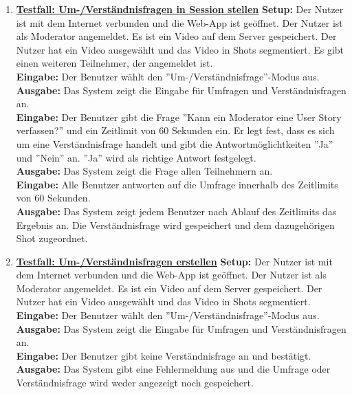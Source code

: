 \begin{enumerate}
	
	\item \underline{\textbf{Testfall: Um-/Verständnisfragen in Session stellen}} \linebreak
	\textbf{Setup:} Der Nutzer ist mit dem Internet verbunden und die Web-App ist geöffnet. Der Nutzer ist als Moderator angemeldet. Es ist ein Video auf dem Server gespeichert. Der Nutzer hat ein Video ausgewählt und das Video in Shots segmentiert. Es gibt einen weiteren Teilnehmer, der angemeldet ist.  \\
	\textbf{Eingabe:} Der Benutzer wählt den ''Um-/Verständnisfrage''-Modus aus. \\
	\textbf{Ausgabe:} Das System zeigt die Eingabe für Umfragen und Verständnisfragen an.\\ 
	\textbf{Eingabe:} Der Benutzer gibt die Frage ''Kann ein Moderator eine User Story verfassen?'' und ein Zeitlimit von 60 Sekunden ein. Er legt fest, dass es sich um eine Verständnisfrage handelt und gibt die Antwortmöglichtkeiten ''Ja'' und ''Nein'' an. ''Ja'' wird als richtige Antwort festgelegt.\\
	\textbf{Ausgabe:} Das System zeigt die Frage allen Teilnehmern an.\\ 
	\textbf{Eingabe:} Alle Benutzer antworten auf die Umfrage innerhalb des Zeitlimits von 60 Sekunden.\\
	\textbf{Ausgabe:} Das System zeigt jedem Benutzer nach Ablauf des Zeitlimits das Ergebnis an. Die Verständnisfrage wird gespeichert und dem dazugehörigen Shot zugeordnet.\\
	
	\item \underline{\textbf{Testfall: Um-/Verständnisfragen erstellen}} \linebreak
	\textbf{Setup:} Der Nutzer ist mit dem Internet verbunden und die Web-App ist geöffnet. Der Nutzer ist als Moderator angemeldet. Es ist ein Video auf dem Server gespeichert. Der Nutzer hat ein Video ausgewählt und das Video in Shots segmentiert. \\
	\textbf{Eingabe:} Der Benutzer wählt den ''Um-/Verständnisfrage''-Modus aus. \\
	\textbf{Ausgabe:} Das System zeigt die Eingabe für Umfragen und Verständnisfragen an.\\ 
	\textbf{Eingabe:} Der Benutzer gibt keine Verständnisfrage an und bestätigt.\\
	\textbf{Ausgabe:} Das System gibt eine Fehlermeldung aus und die Umfrage oder Verständnisfrage wird weder angezeigt noch gespeichert.
	

\end{enumerate}
